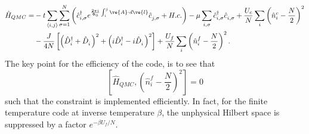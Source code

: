 \begin{align}
	\hat{H}_{QMC}      =  &   - t  \sum_{\langle i,j \rangle}    \sum_{\sigma=1}^{N}  \left(  \hat{c}^{\dagger}_{i,\sigma}  e^{\frac{2\pi i}{\Phi_0}  \int_{i}^{j} \ve{A}\cdot d \ve{l}}\hat{c}^{\phantom\dagger}_{j,\sigma}   + H.c.  \right)  - \mu \sum_{i,\sigma} \hat{c}^{\dagger}_{i,\sigma}  \hat{c}^{\phantom\dagger}_{i,\sigma} 
	+    \frac{U_c}{N}  \sum_{i}   \left( \hat{n}^c_i -  \frac{N}{2} \right)^2   \nonumber \\
          & -  \frac{J}{4N}    \left[ \left(   \hat{D}^{\dagger}_{i}  + \hat{D}^{\phantom\dagger}_{i}    \right)^{2}  + 
                                                       \left(  i\hat{D}^{\dagger}_{i}  - i  \hat{D}^{\phantom\dagger}_{i}    \right)^2  \right]  
       +    \frac{U_f}{N}  \sum_{i}   \left( \hat{n}^f_i -  \frac{N}{2} \right)^2.
\label{Kondo_SUN_Ham_QMC.eq}
\end{align}
The key point for the efficiency of the code, is to  see that 
\begin{equation}
	\left[   \hat{H}_{QMC},  \left( \hat{n}^f_i -  \frac{N}{2} \right)^2  \right]    = 0 
\label{Constraint_KLM.eq}
\end{equation}
such that the  constraint is implemented  efficiently.  In fact, for the finite temperature code  at inverse temperature $\beta$,  the unphysical Hilbert space   is suppressed by a  
factor  $e^{- \beta U_f/N} $. 





